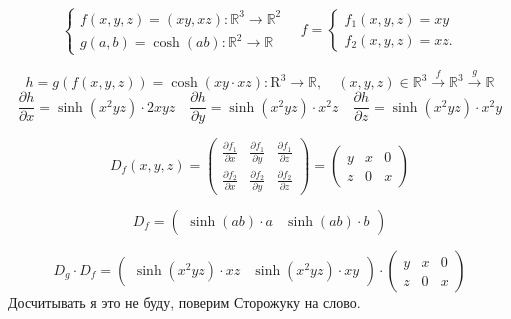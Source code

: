 \begin{example}
    \begin{equation*}
        \begin{cases}
            f(x, y, z) = (xy, xz): \mathbb{R}^3 \to \mathbb{R}^2\\
            g(a, b) = \cosh(ab): \mathbb{R}^2 \to \mathbb{R}
        \end{cases} \quad
        f =
        \begin{cases}
            f_1(x, y, z) = xy\\
            f_2(x, y, z) = xz.
        \end{cases}
    \end{equation*}

    \begin{equation*}
        h = g(f(x, y, z)) = \cosh(xy \cdot xz): \mbox{R}^3 \to \mathbb{R}, \quad (x, y, z) \in \mathbb{R}^3 \overset{f}{\to} \mathbb{R}^3 \overset{g}{\to} \mathbb{R}
    \end{equation*}
    \begin{equation*}
        \frac{\partial h}{\partial x} = \sinh(x^2yz)\cdot 2xyz \quad
        \frac{\partial h}{\partial y} = \sinh(x^2yz)\cdot x^2z \quad
        \frac{\partial h}{\partial z} = \sinh(x^2yz) \cdot x^2y
    \end{equation*}

    \[D_f(x, y, z) = \begin{pmatrix}
        \frac{\partial f_1}{\partial x} & \frac{\partial f_1}{\partial y} &  \frac{\partial f_1}{\partial z} \\
        \frac{\partial f_2}{\partial x} & \frac{\partial f_2}{\partial y} &  \frac{\partial f_2}{\partial z}  
    \end{pmatrix} =
    \begin{pmatrix}
        y & x & 0 \\
        z & 0 & x
    \end{pmatrix}
    \]

    \[D_f = \begin{pmatrix}
        \sinh(ab)\cdot a & \sinh(ab) \cdot b
    \end{pmatrix}\]

    \[D_g \cdot D_f = \begin{pmatrix}
        \sinh(x^2yz)\cdot xz & \sinh(x^2yz)\cdot xy
    \end{pmatrix} \cdot \begin{pmatrix}
        y & x & 0 \\
        z & 0 & x
    \end{pmatrix}
    \]
    Досчитывать я это не буду, поверим Сторожуку на слово.
\end{example}

